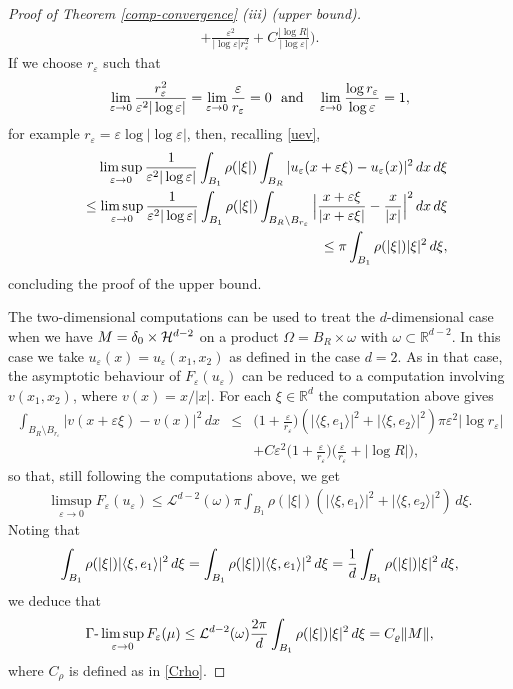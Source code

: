 \documentclass[11pt]{article}
\def\e{\varepsilon}
\begin{document}
\begin{proof}[Proof of Theorem {\rm\ref{comp-convergence}} {\rm (iii)} (upper bound)]
\begin{eqnarray*}
+\frac{\e^2}{|\log\e| r_\e^2}
+C\frac{|\log R|}{|\log \e|}\Big). 
\end{eqnarray*}
If we choose $r_\e$ such that 
$$
\lim_{\e\to 0}
\frac{ r_\e^2}{\e^2|\log\e|}=
\lim_{\e\to 0}\frac{\e}{r_\e}= 0 \ \ \hbox{\rm and } \ \ 
\lim_{\e\to 0}\frac{\log r_\e}{\log\e}= 1,$$ 
for example $r_\e=\e\log|\log\e|$, then, recalling \eqref{uev},  
\begin{eqnarray*}
&&\hspace{-1cm}
\limsup_{\e\to 0}\frac{1}{\e^2|\log\e|}\int_{B_1}\rho(|\xi|)\int_{B_{R}} | u_\e(x+\e \xi)-u_\e(x)|^2\, dx\, d\xi \\
&&\leq \limsup_{\e\to 0}\frac{1}{\e^2|\log\e|}\int_{B_1}\rho(|\xi|)\int_{B_{R}\setminus B_{r_\e}} \Big| \frac{x+\e \xi}{|x+\e \xi|}-\frac{x}{|x|} \Big|^2\, dx\, d\xi 
\\
&&\leq 
\pi \int_{B_1}\rho(|\xi|)|\xi|^2\, d\xi, 
\end{eqnarray*}
concluding the proof of the upper bound. 

\medskip

The two-dimensional computations can be used to treat the $d$-dimensional case when we have $M=\delta_0\times {\cal H}^{d-2}$ on a product $\Omega=B_{R}\times\omega$ with  $\omega\subset \mathbb R^{d-2}$.
In this case we take $u_\e(x)=u_\e(x_1,x_2)$ as defined in the case $d=2$. As in that case, the asymptotic behaviour of  $F_\e(u_\e)$ can be reduced to a computation involving $v(x_1,x_2)$, where $v(x)=x/|x|$.
For each $\xi\in \mathbb R^d$ the computation above gives
\begin{eqnarray*}
\int_{B_{R}\setminus B_{r_\e}} | v(x+\e \xi)-v(x)|^2\, dx&\leq&\Big(1+\frac{\e}{r_\e}\Big)(|\langle\xi,e_1\rangle|^2+|\langle\xi,e_2\rangle|^2) \pi \e^2|\log r_\e|\\
&&+C\e^2\Big(1+\frac{\e}{r_\e}\Big)\Big(\frac{\e}{r_\e}+|\log R|\Big),  
\end{eqnarray*}
so that, still following the computations above, we get 
\begin{eqnarray*}
\limsup_{\e\to 0}F_\e(u_\e)\le   {\mathcal L}^{d-2}(\omega)\pi \int_{B_1}\rho(|\xi|)(|\langle\xi,e_1\rangle|^2+|\langle\xi,e_2\rangle|^2)\, d\xi.  
\end{eqnarray*} 
Noting that 
$$
\int_{B_1}\rho(|\xi|)|\langle\xi,e_1\rangle|^2\, d\xi= \int_{B_1}\rho(|\xi|)|\langle\xi,e_1\rangle|^2\, d\xi={1\over d} \int_{B_1}\rho(|\xi|)|\xi|^2\, d\xi,
$$
we deduce that
\begin{equation}\label{gasup}
\Gamma\hbox{-}\limsup_{\e\to 0}F_\e(\mu)\le {\mathcal L}^{d-2}(\omega){2\pi\over d} \int_{B_1}\rho(|\xi|)|\xi|^2\, d\xi= C_\varrho \|M\|,  
\end{equation} 
where $C_\rho$ is defined as in \eqref{Crho}.



\end{proof}
\end{document}
